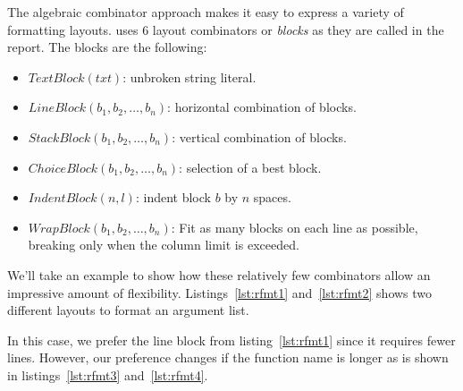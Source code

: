 The algebraic combinator approach makes it easy to express a variety of formatting layouts.
\rfmt{} uses 6 layout combinators or \emph{blocks} as they are called in the report.
The blocks are the following:
\begin{itemize}
  \item $TextBlock(txt)$: unbroken string literal.
  \item $LineBlock(b_1, b_2, \ldots, b_n)$: horizontal combination of blocks.
  \item $StackBlock(b_1, b_2, \ldots, b_n)$: vertical combination of blocks.
  \item $ChoiceBlock(b_1, b_2, \ldots, b_n)$: selection of a best block.
  \item $IndentBlock(n, l)$: indent block $b$ by $n$ spaces.
  \item $WrapBlock(b_1, b_2, \ldots, b_n)$:
    Fit as many blocks on each line as possible, breaking only when the column limit is exceeded.
\end{itemize}
We'll take an example to show how these relatively few combinators allow an impressive amount of flexibility.
Listings~\ref{lst:rfmt1} and~\ref{lst:rfmt2} shows two different layouts to format an argument list.

\begin{minipage}{.45\textwidth}
  
\end{minipage}
\hfil
\begin{minipage}{.45\textwidth}
  
\end{minipage}

In this case, we prefer the line block from listing~\ref{lst:rfmt1} since it requires fewer lines.
However, our preference changes if the function name is longer as is shown in listings~\ref{lst:rfmt3} and~\ref{lst:rfmt4}.

\begin{minipage}{.45\textwidth}
  
\end{minipage}
\hfil
\begin{minipage}{.45\textwidth}
  
\end{minipage}

